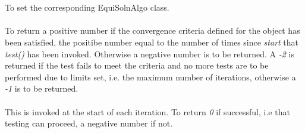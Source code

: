   \\
 \\
To set the corresponding EquiSolnAlgo class. \\

 \\
To return a positive number if the convergence criteria defined for the
object has been satisfied, the positibe number equal to the number of times 
since {\em start} that {\em test()} has been invoked. Otherwise a negative number 
is to be returned. A {\em -2} 
is returned if the test fails to meet the criteria and no more tests are to be 
performed due to limits set, i.e. the maximum number of iterations, otherwise a
{\em -1} is to be returned.  \\

 \\
This is invoked at the start of each iteration. To return {\em 0} if successful, i.e 
that testing can proceed, a negative number if not. \\